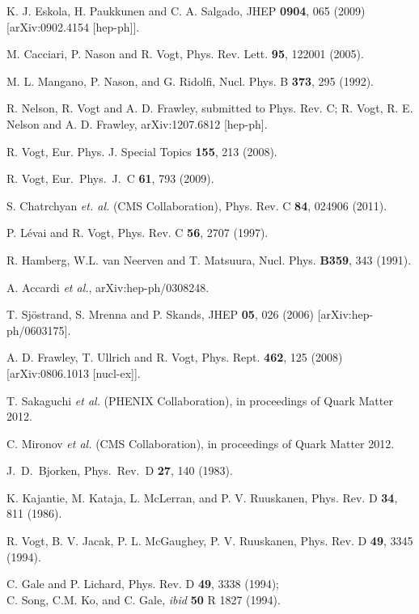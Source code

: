 \begin{thebibliography}{999}
 K. J. Eskola, H. Paukkunen and C. A. Salgado, JHEP
{\bf 0904}, 065 (2009) [arXiv:0902.4154 [hep-ph]].
                                                              
 M. Cacciari, P. Nason and R. Vogt, Phys. Rev. Lett.
{\bf 95}, 122001 (2005).

 M. L. Mangano, P. Nason, and G. Ridolfi, Nucl. Phys. B 
{\bf 373}, 295 (1992).

 R. Nelson, R. Vogt and A. D. Frawley, submitted to Phys. Rev. C;
R. Vogt, R. E. Nelson and A. D. Frawley, arXiv:1207.6812 [hep-ph].

 R. Vogt, Eur. Phys. J.
Special Topics {\bf 155}, 213 (2008).

 R. Vogt, Eur.\ Phys.\ J.\ C {\bf 61}, 793 (2009).


 S. Chatrchyan {\it et. al.} (CMS Collaboration), 
Phys. Rev. C {\bf 84}, 024906 (2011).

 P. L\'{e}vai 
and R. Vogt, Phys. Rev. C {\bf 56}, 2707 (1997).

 R. Hamberg, W.L. van Neerven and T. Matsuura,
Nucl. Phys. {\bf B359}, 343 (1991). 

 A. Accardi {\it et al.},  arXiv:hep-ph/0308248.

 T. Sj\"{o}strand, S. Mrenna and P. Skands, JHEP {\bf 05}, 026
(2006) [arXiv:hep-ph/0603175].

 A. D. Frawley, T. Ullrich and R. Vogt, Phys. Rept. {\bf 462}, 
125 (2008) [arXiv:0806.1013 [nucl-ex]].

  T. Sakaguchi {\it et al.} (PHENIX Collaboration), 
in proceedings of Quark Matter 2012.

 C. Mironov {\it et al.} (CMS Collaboration), in proceedings
of Quark Matter 2012.

 J.~D.~Bjorken,  Phys.\ Rev.\ D {\bf 27}, 140 (1983).
              
 K. Kajantie, M. Kataja, L. McLerran, and P. V. Ruuskanen,
               Phys. Rev. D {\bf 34}, 811 (1986).

 R. Vogt, B. V. Jacak, P. L. McGaughey, P. V. Ruuskanen,
          Phys. Rev. D {\bf 49}, 3345 (1994).

 C. Gale and P. Lichard, Phys. Rev. D {\bf 49}, 3338 (1994); \\
               C. Song, C.M. Ko, and C. Gale, {\it ibid} {\bf 50} R 1827 (1994).
                

\end{thebibliography}
